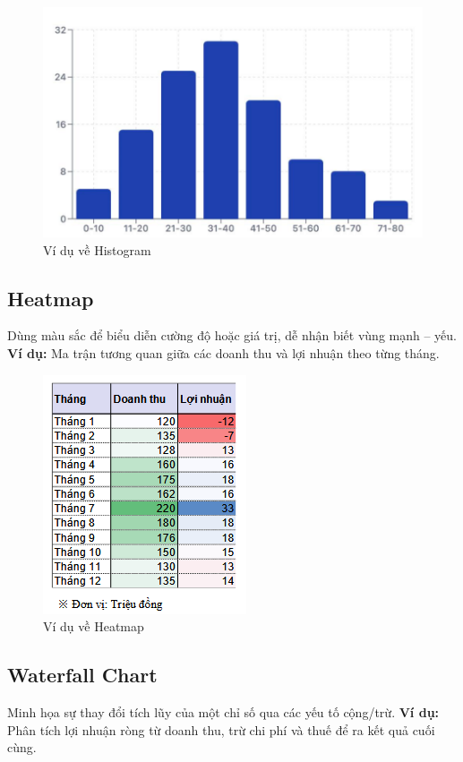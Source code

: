 \documentclass[11pt]{article}
\begin{document}
\begin{figure}[H]
    \centering
    \includegraphics[width=0.6\linewidth]{images/histogram.png}
    \caption{Ví dụ về Histogram}
    \label{fig:histogram}
\end{figure}

\subsection{Heatmap}
Dùng màu sắc để biểu diễn cường độ hoặc giá trị, dễ nhận biết vùng mạnh – yếu.
\textbf{Ví dụ:} Ma trận tương quan giữa các doanh thu và lợi nhuận theo từng tháng.

\begin{figure}[H]
    \centering
    \includegraphics[width=0.6\linewidth]{images/heatmap.png}
    \caption{Ví dụ về Heatmap}
    \label{fig:heatmap}
\end{figure}

\subsection{Waterfall Chart}
Minh họa sự thay đổi tích lũy của một chỉ số qua các yếu tố cộng/trừ.
\textbf{Ví dụ:} Phân tích lợi nhuận ròng từ doanh thu, trừ chi phí và thuế để ra kết quả cuối cùng.
\end{document}
